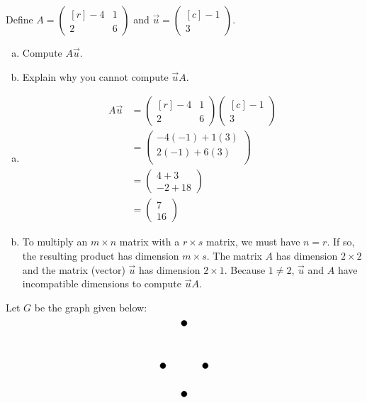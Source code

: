 \documentclass[12pt,letterpaper]{exam}
\begin{document}
\begin{questions}
\newpage
\question[10] Define $A= \begin{pmatrix*}[r] -4 & 1 \\ 2 & 6 \end{pmatrix*}$ and $\vec{u}= \begin{pmatrix*}[c] -1 \\ 3 \end{pmatrix*}$. 
	\begin{enumerate}[(a)]
	\item Compute $A \vec{u}$.
	\item Explain why you cannot compute $\vec{u} A$. 
	\end{enumerate} \pspace

\sol 
\begin{enumerate}[(a)]
\item 
	\[
	\begin{aligned}
	A \vec{u}&= \begin{pmatrix*}[r] -4 & 1 \\ 2 & 6 \end{pmatrix*}  \begin{pmatrix*}[c] -1 \\ 3 \end{pmatrix*} \\[0.3cm]
	&= \begin{pmatrix} -4(-1) + 1(3) \\ 2(-1) + 6(3) \\ \end{pmatrix} \\[0.3cm]
	&= \begin{pmatrix} 4 + 3 \\ -2 + 18 \end{pmatrix} \\[0.3cm]
	&= \begin{pmatrix} 7 \\ 16 \end{pmatrix}
	\end{aligned}
	\] \pspace

\item To multiply an $m \times n$ matrix with a $r \times s$ matrix, we must have $n= r$. If so, the resulting product has dimension $m \times s$. The matrix $A$ has dimension $2 \times 2$ and the matrix (vector) $\vec{u}$ has dimension $2 \times 1$. Because $1 \neq 2$, $\vec{u}$ and $A$ have incompatible dimensions to compute $\vec{u} A$. 
\end{enumerate}



\newpage
\question[10] Let $G$ be the graph given below:
	\[
	\begin{tikzpicture}
	\draw[fill=black] (0.75,1.5) circle (0.1); %
	\draw[fill=black] (0,0) circle (0.1); %
	\draw[fill=black] (1.5,0) circle (0.1); %
	\draw[fill=black] (0.75,-1) circle (0.1); %
	

\end{tikzpicture}\]
\end{questions}
\end{document}
